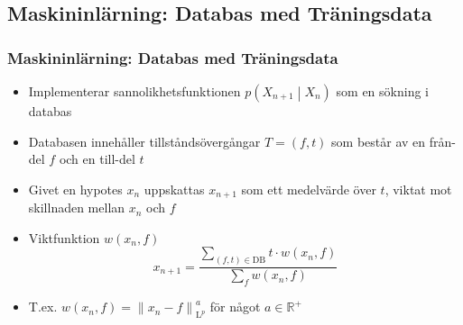 \documentclass[]{beamer}
\renewcommand{\ae}{\"{a}}
\renewcommand{\oe}{\"{o}}
\newcommand{\prob}[1]{p\left(#1\right)}
\newcommand{\cprob}[2]{\prob{\left. #1 \middle\vert #2 \right.}}
\newcommand{\cprobnext}[1]{\cprob{#1_{n+1}}{#1_n}}
\newcommand{\norm}[1]{\left\|#1\right\|}
\newcommand{\Lp}[1]{\mathrm{L}^{#1}}
\newcommand{\bbset}[1]{\mathbb{#1}}
\newcommand{\RP}{\bbset{R}^+}
\begin{document}
\subsection{Maskininl\ae rning: Databas med Tr\ae ningsdata}
\begin{frame}
  \frametitle{Maskininl\ae rning: Databas med Tr\ae ningsdata}
  \begin{itemize}
  \item Implementerar sannolikhetsfunktionen $\cprobnext{X}$ som en s\oe kning i databas
  \item Databasen inneh\aa ller tillst\aa nds\oe verg\aa ngar $T = (f, t)$ som best\aa r av en fr\aa n-del $f$ och en till-del $t$
  \item Givet en hypotes $x_n$ uppskattas $x_{n+1}$ som ett medelv\ae rde \oe ver $t$, viktat mot skillnaden mellan $x_n$ och $f$
  \item Viktfunktion $w(x_n, f)$
    \begin{equation*}
      x_{n+1} = \frac{\sum\limits_{(f, t) \in \mathrm{DB}} t \cdot w(x_n, f)}{\sum\limits_f w(x_n, f)}
    \end{equation*}
  \item T.ex. $w(x_n, f) = \norm{x_n - f}_{\Lp{p}}^a$ f\oe r n\aa got $a\in \RP$
  \end{itemize}
\end{frame}
\end{document}
